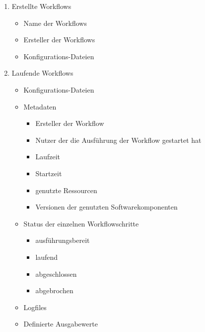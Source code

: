 \begin{enumerate}
    \item Erstellte \glspl{Workflow}
    \begin{itemize}
        \setlength\itemsep{-1em}
        \item Name der \glspl{Workflow}
        \item Ersteller der \glspl{Workflow}
        \item Konfigurations-Dateien
    \end{itemize}
    \newpage
    \item Laufende \glspl{Workflow}
    \begin{itemize}
        \setlength\itemsep{-1em}
        \item Konfigurations-Dateien
        \item Metadaten
        \begin{itemize}
            \setlength\itemsep{-1em}
            \item Ersteller der \gls{Workflow}
            \item Nutzer der die Ausführung der \gls{Workflow} gestartet hat
            \item Laufzeit
            \item Startzeit
            \item genutzte Ressourcen
            \item Versionen der genutzten Softwarekomponenten
        \end{itemize}
        \item Status der einzelnen Workflowschritte
        \begin{itemize}
            \setlength\itemsep{-1em}
            \item ausführungsbereit
            \item laufend
            \item abgeschlossen
            \item abgebrochen
        \end{itemize}
        \item Logfiles
        \item Definierte Ausgabewerte
    \end{itemize}
    

\end{enumerate}
